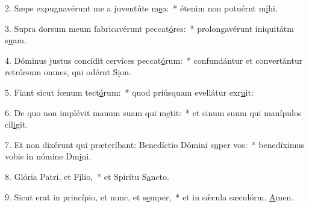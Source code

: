 2. Sæpe expugnavérunt me a juventúte m\uline{e}a:~* étenim non potuérnt m\uline{i}hi.\par 
3. Supra dorsum meum fabricavérunt peccat\uline{ó}res:~* prolongavérunt iniquitátm s\uline{u}am.\par 
4. Dóminus justus concídit cervíces peccat\uline{ó}rum:~* confundántur et convertántur retrórsum omnes, qui odérnt S\uline{i}on.\par 
5. Fiant sicut fœnum tect\uline{ó}rum:~* quod priúsquam evellátur exr\uline{u}it:\par 
6. De quo non implévit manum suam qui m\uline{e}tit:~* et sinum suum qui manípulos cll\uline{i}git.\par 
7. Et non dixérunt qui præteríbant: Benedíctio Dómini s\uline{u}per vos:~* benedíximus vobis in nómine Dm\uline{i}ni.\par 
8. Glória Patri, et F\uline{í}lio,~* et Spirítu S\uline{a}ncto.\par 
9. Sicut erat in princípio, et nunc, et s\uline{e}mper,~* et in sǽcula sæculórm. \uline{A}men.\par 
